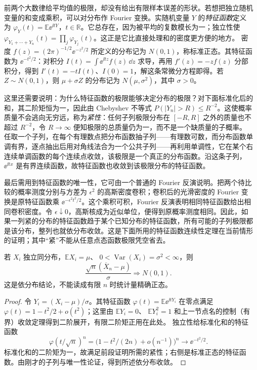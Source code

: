 前两个大数律给平均值的极限，却没有给出有限样本误差的形状。若想把独立随机变量的和变成乘积，可以对分布作 Fourier 变换。实随机变量 \(Y\) 的\emph{特征函数}定义为
\(\varphi_Y(t)=\mathbb E\ee^{\ii tY}\)，\(t\in\mathbb R\)。它总存在，因为被平均的复数模长为一；独立性使
\(\varphi_{Y_1+\cdots+Y_n}(t)=\prod_j\varphi_{Y_j}(t)\)。这正是它比直接处理和的密度更方便的地方。
密度
\(f(z)=(2\pi)^{-1/2}\ee^{-z^2/2}\) 所定义的分布记为
\(N(0,1)\)，称标准正态。其特征函数为
\(\ee^{-t^2/2}\)：对积分
\(I(t)=\int\ee^{\ii tz}f(z)\,\dd z\) 求导，再用
\(f'(z)=-zf(z)\) 分部积分，得到
\(I'(t)=-tI(t)\)、\(I(0)=1\)，解这条常微分方程即得。若 \(Z\sim N(0,1)\)，则 \(\mu+\sigma Z\) 的分布记为
\(N(\mu,\sigma^2)\)，其中 \(\sigma>0\)。

这里还需要说明：为什么特征函数的极限能够决定分布的极限？对下面标准化后的和，其二阶矩恒为一，因此由
Chebyshev 不等式 \(P(|Y_n|>R)\le R^{-2}\)。这使概率质量不会逃向无穷远，称为\emph{紧性}：任何子列极限分布在 \([-R,R]\) 之外的质量也不超过 \(R^{-2}\)，令 \(R\to\infty\) 便知极限的总质量仍为一，而不是一个缺质量的子概率。任取一个子列，在每个有理数点把分布函数抽子列——有理数可数，而分布函数单调有界，逐点抽出后用对角线法合为一个公共子列——再利用单调性，它在某个右连续单调函数的每个连续点收敛，该极限是一个真正的分布函数。沿这条子列，\(\ee^{\ii tx}\) 是有界连续函数，故特征函数也收敛到该极限分布的特征函数。

最后需用到特征函数的唯一性，它可由一个普通的 Fourier 反演说明。把两个待比较的概率测度分别与方差为 \(\epsilon^2\) 的高斯密度卷积；卷积后的光滑密度的 Fourier 变换是原特征函数乘 \(\ee^{-\epsilon^2t^2/2}\)。这个乘积可积，Fourier 反演表明相同特征函数给出相同卷积密度。令 \(\epsilon\downarrow0\)，高斯核成为近似单位，便得到原概率测度相同。因此，如果一列紧的分布的特征函数趋于某个已知分布的特征函数，所有可能的子列极限都是该分布，整列也就依分布收敛。这是下面所用的特征函数连续性定理在当前情形的证明；其中“紧”不能从任意点态函数极限凭空省去。

\begin{theorem}[独立同分布中心极限定理]
若 \(X_i\) 独立同分布，\(\mathbb E X_i=\mu\)、
\(0<\operatorname{Var}(X_i)=\sigma^2<\infty\)，则
\[
\frac{\sqrt n(\overline X_n-\mu)}{\sigma}\Rightarrow N(0,1).
\]
这是依分布结论，不能读成有限 \(n\) 时统计量精确正态。
\end{theorem}
\begin{proof}
令 \(Y_i=(X_i-\mu)/\sigma\)。其特征函数
\(\varphi(t)=\mathbb E\ee^{\ii tY_i}\) 在零点满足
\(\varphi(t)=1-t^2/2+o(t^2)\)；这里由 \(\mathbb E Y_i=0\)、
\(\mathbb E Y_i^2=1\) 和上一节点名的控制（有界）收敛定理得到二阶展开，有限二阶矩正用在此处。
独立性给标准化和的特征函数
\[
\varphi(t/\sqrt n)^n
=\bigl(1-t^2/(2n)+o(n^{-1})\bigr)^n
\longrightarrow \ee^{-t^2/2}.
\]
标准化和的二阶矩为一，故满足前段证明所需的紧性；右侧是标准正态的特征函数。由刚才的子列与唯一性论证，得到所述依分布收敛。
\end{proof}

